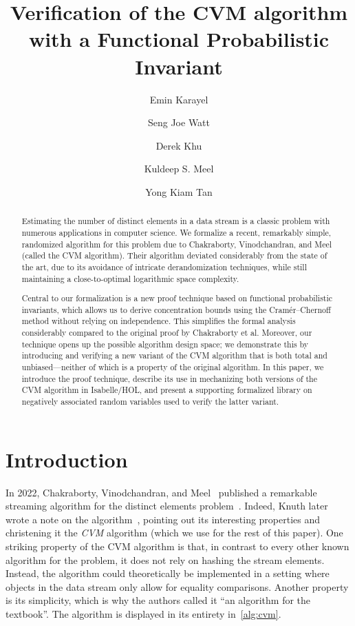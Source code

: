\documentclass[a4paper,UKenglish,cleveref, autoref, thm-restate]{lipics-v2021}
\title{Verification of the CVM algorithm with a Functional Probabilistic Invariant}
\author{Emin Karayel}{Technical University of Munich, School of Computation, Information and Technology, Germany}{me@eminkarayel.de}{https://orcid.org/0000-0003-3290-5034}{}
\author{Seng Joe Watt}{Institute for Infocomm Research (I$^2$R), A*STAR, Singapore}{Watt_Seng_Joe@i2r.a-star.edu.sg}{https://orcid.org/0000-0002-6883-4736}{Singapore NRF Fellowship Programme NRF-NRFF16-2024-0002}
\author{Derek Khu}{Institute for Infocomm Research (I$^2$R), A*STAR, Singapore}{derek_khu@i2r.a-star.edu.sg}{https://orcid.org/0009-0000-0293-0664}{}
\author{Kuldeep S. Meel}{Georgia Institute of Technology, United States \and  University of Toronto, Canada}{meel@cs.toronto.edu}{https://orcid.org/0000-0001-9423-5270}{Natural Sciences and Engineering Research Council of Canada (NSERC), funding reference [RGPIN-2024-05956]}
\author{Yong Kiam Tan}{Institute for Infocomm Research (I$^2$R), A*STAR, Singapore \and Nanyang Technological University, Singapore}{yongkiam.tan@ntu.edu.sg}{https://orcid.org/0000-0001-7033-2463}{Singapore NRF Fellowship Programme NRF-NRFF16-2024-0002}
\begin{document}
\maketitle

\begin{abstract}
Estimating the number of distinct elements in a data stream is a classic problem with numerous applications in computer science.
We formalize a recent, remarkably simple, randomized algorithm for this problem due to Chakraborty, Vinodchandran, and Meel (called the CVM algorithm).
Their algorithm deviated considerably from the state of the art, due to its avoidance of intricate derandomization techniques, while still maintaining a close-to-optimal logarithmic space complexity.

Central to our formalization is a new proof technique based on functional probabilistic invariants, which allows us to derive concentration bounds using the Cram\'{e}r--Chernoff method without relying on independence.
This simplifies the formal analysis considerably compared to the original proof by Chakraborty et al.
Moreover, our technique opens up the possible algorithm design space; we demonstrate this by introducing and verifying a new variant of the CVM algorithm that is both total and unbiased---neither of which is a property of the original algorithm.
In this paper, we introduce the proof technique, describe its use in mechanizing both versions of the CVM algorithm in Isabelle/HOL, and present a supporting formalized library on negatively associated random variables used to verify the latter variant.
\end{abstract}

\section{Introduction}
\label{sec:intro}

In 2022, Chakraborty, Vinodchandran, and Meel~\cite{chakraborty2022} published a remarkable streaming algorithm for the distinct elements problem~\cite{quanta}.
Indeed, Knuth later wrote a note on the algorithm~\cite{knuthnote}, pointing out its interesting properties and christening it the \emph{CVM} algorithm (which we use for the rest of this paper).
One striking property of the CVM algorithm is that, in contrast to every other known algorithm for the problem, it does not rely on hashing the stream elements.
Instead, the algorithm could theoretically be implemented in a setting where objects in the data stream only allow for equality comparisons.
Another property is its simplicity, which is why the authors called it ``an algorithm for the textbook''.
The algorithm is displayed in its entirety in~\cref{alg:cvm}.
\end{document}
